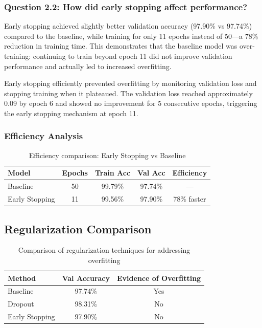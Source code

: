 \subsubsection{Question 2.2: How did early stopping affect performance?}

Early stopping achieved slightly better validation accuracy (97.90\% vs 97.74\%) compared to the baseline, while training for only 11 epochs instead of 50---a 78\% reduction in training time. This demonstrates that the baseline model was over-training: continuing to train beyond epoch 11 did not improve validation performance and actually led to increased overfitting.

Early stopping efficiently prevented overfitting by monitoring validation loss and stopping training when it plateaued. The validation loss reached approximately 0.09 by epoch 6 and showed no improvement for 5 consecutive epochs, triggering the early stopping mechanism at epoch 11.

\subsubsection{Efficiency Analysis}
\begin{table}[h]
\centering
\begin{tabular}{|l|c|c|c|c|}
\hline
\textbf{Model} & \textbf{Epochs} & \textbf{Train Acc} & \textbf{Val Acc} & \textbf{Efficiency} \\ \hline
Baseline       & 50              & 99.79\%            & 97.74\%          & ---                 \\ \hline
Early Stopping & 11              & 99.56\%            & 97.90\%          & 78\% faster         \\ \hline
\end{tabular}
\caption{Efficiency comparison: Early Stopping vs Baseline}
\label{tab:early-stopping-comparison}
\end{table}

\subsection{Regularization Comparison}

\begin{table}[h]
\centering
\begin{tabular}{|l|c|c|}
\hline
\textbf{Method}        & \textbf{Val Accuracy} & \textbf{Evidence of Overfitting} \\ \hline
Baseline               & 97.74\%               & Yes                              \\ \hline
Dropout                & 98.31\%               & No                               \\ \hline
Early Stopping         & 97.90\%               & No                               \\ \hline
\end{tabular}
\caption{Comparison of regularization techniques for addressing overfitting}
\label{tab:regularization-comparison}
\end{table}

